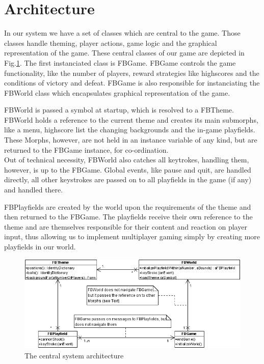 \section{Architecture}
In our system we have a set of classes which are central to the 
game. Those classes handle theming, player actions, game logic 
and the graphical representation of the game. These central
classes of our game are depicted in Fig.\ref{fig:architecture}.
%
The first instanciated class is FBGame. FBGame controls the game functionality, 
like the number of players, reward strategies like highscores and the
conditions of victory and defeat. FBGame is also responsible for instanciating
the FBWorld class which encapsulates graphical representation of the game.

FBWorld is passed a symbol at startup, which is resolved to a FBTheme. FBWorld 
holds a reference to the current theme and creates its main submorphs, like
a menu, highscore list the changing backgrounds and the in-game playfields.
These Morphs, however, are not held in an instance variable of any kind, but 
are returned to the FBGame instance, for co-ordination.\\
Out of technical necessity, FBWorld also catches all keytrokes, handling them, 
however, is up to the FBGame. Global events, like pause and quit, are handled 
directly, all other keystrokes are passed on to all playfields in the game (if any)
and handled there.

FBPlayfields are created by the world upon the requirements of the theme
and then returned to the FBGame. The playfields receive their own reference 
to the theme and are themselves responsible for their content and reaction on 
player input, thus allowing us to implement multiplayer gaming simply by creating 
more playfields in our world.
%
\begin{figure}[bt]
  \begin{center}
    \includegraphics[width=\linewidth]{images/architecture.png}
  \end{center}
  \caption{The central system architecture}
  \label{fig:architecture}
\end{figure}


